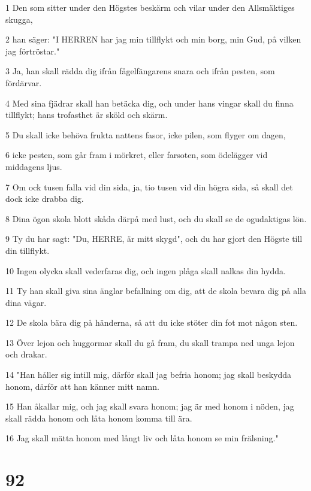 \par 1 Den som sitter under den Högstes beskärm och vilar under den Allsmäktiges skugga,
\par 2 han säger: "I HERREN har jag min tillflykt och min borg, min Gud, på vilken jag förtröstar."
\par 3 Ja, han skall rädda dig ifrån fågelfängarens snara och ifrån pesten, som fördärvar.
\par 4 Med sina fjädrar skall han betäcka dig, och under hans vingar skall du finna tillflykt; hans trofasthet är sköld och skärm.
\par 5 Du skall icke behöva frukta nattens fasor, icke pilen, som flyger om dagen,
\par 6 icke pesten, som går fram i mörkret, eller farsoten, som ödelägger vid middagens ljus.
\par 7 Om ock tusen falla vid din sida, ja, tio tusen vid din högra sida, så skall det dock icke drabba dig.
\par 8 Dina ögon skola blott skåda därpå med lust, och du skall se de ogudaktigas lön.
\par 9 Ty du har sagt: "Du, HERRE, är mitt skygd", och du har gjort den Högste till din tillflykt.
\par 10 Ingen olycka skall vederfaras dig, och ingen plåga skall nalkas din hydda.
\par 11 Ty han skall giva sina änglar befallning om dig, att de skola bevara dig på alla dina vägar.
\par 12 De skola bära dig på händerna, så att du icke stöter din fot mot någon sten.
\par 13 Över lejon och huggormar skall du gå fram, du skall trampa ned unga lejon och drakar.
\par 14 "Han håller sig intill mig, därför skall jag befria honom; jag skall beskydda honom, därför att han känner mitt namn.
\par 15 Han åkallar mig, och jag skall svara honom; jag är med honom i nöden, jag skall rädda honom och låta honom komma till ära.
\par 16 Jag skall mätta honom med långt liv och låta honom se min frälsning."

\chapter{92}

